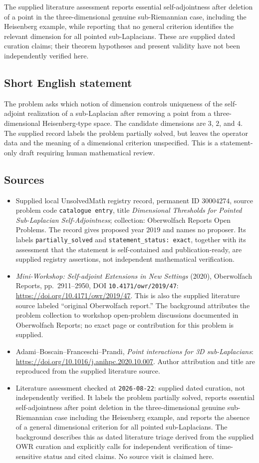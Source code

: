 \documentclass[11pt]{article}
\begin{document}
The supplied literature assessment reports essential self-adjointness after deletion of a point in the three-dimensional genuine sub-Riemannian case, including the Heisenberg example, while reporting that no general criterion identifies the relevant dimension for all pointed sub-Laplacians. These are supplied dated curation claims; their theorem hypotheses and present validity have not been independently verified here.
\subsection{Short English statement}
The problem asks which notion of dimension controls uniqueness of the self-adjoint realization of a sub-Laplacian after removing a point from a three-dimensional Heisenberg-type space. The candidate dimensions are \(3\), \(2\), and \(4\). The supplied record labels the problem partially solved, but leaves the operator data and the meaning of a dimensional criterion unspecified. This is a statement-only draft requiring human mathematical review.
\subsection{Sources}
\begin{itemize}
\item Supplied local UnsolvedMath registry record, permanent ID \(30004274\), source problem code \texttt{catalogue entry}, title \emph{Dimensional Thresholds for Pointed Sub-Laplacian Self-Adjointness}; collection: Oberwolfach Reports Open Problems. The record gives proposed year \(2019\) and names no proposer. Its labels \texttt{partially\_solved} and \texttt{statement\_status: exact}, together with its assessment that the statement is self-contained and publication-ready, are supplied registry assertions, not independent mathematical verification.
\item \emph{Mini-Workshop: Self-adjoint Extensions in New Settings} (2020), Oberwolfach Reports, pp.\ 2911--2950, DOI \texttt{10.4171/owr/2019/47}: \url{https://doi.org/10.4171/owr/2019/47}. This is also the supplied literature source labeled ``original Oberwolfach report.'' The background attributes the problem collection to workshop open-problem discussions documented in Oberwolfach Reports; no exact page or contribution for this problem is supplied.
\item Adami--Boscain--Franceschi--Prandi, \emph{Point interactions for 3D sub-Laplacians}: \url{https://doi.org/10.1016/j.anihpc.2020.10.007}. Author attribution and title are reproduced from the supplied literature source.
\item Literature assessment checked at \texttt{2026-08-22}: supplied dated curation, not independently verified. It labels the problem partially solved, reports essential self-adjointness after point deletion in the three-dimensional genuine sub-Riemannian case including the Heisenberg example, and reports the absence of a general dimensional criterion for all pointed sub-Laplacians. The background describes this as dated literature triage derived from the supplied OWR curation and explicitly calls for independent verification of time-sensitive status and cited claims. No source visit is claimed here.
\end{itemize}
\end{document}
